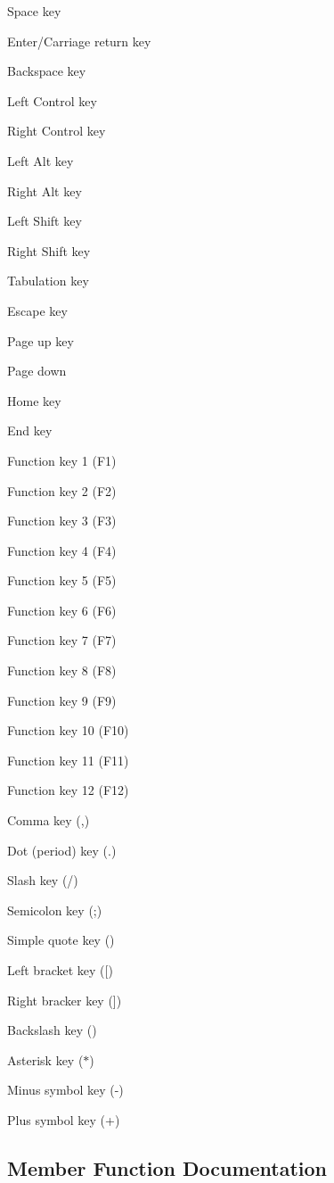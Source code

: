 Space key

Enter/\+Carriage return key

Backspace key

Left Control key

Right Control key

Left Alt key

Right Alt key

Left Shift key

Right Shift key

Tabulation key

Escape key

Page up key

Page down

Home key

End key

Function key 1 (F1)

Function key 2 (F2)

Function key 3 (F3)

Function key 4 (F4)

Function key 5 (F5)

Function key 6 (F6)

Function key 7 (F7)

Function key 8 (F8)

Function key 9 (F9)

Function key 10 (F10)

Function key 11 (F11)

Function key 12 (F12)

Comma key (,)

Dot (period) key (.)

Slash key (/)

Semicolon key (;)

Simple quote key (\textquotesingle{})

Left bracket key (\mbox{[})

Right bracker key (\mbox{]})

Backslash key ()

Asterisk key ($\ast$)

Minus symbol key (-\/)

Plus symbol key (+) 

\subsection{Member Function Documentation}
\mbox{\label{classarcade_1_1_gfx_lapin_a42dd719cbf1cd88c3abf70d16f02fd92}} 
